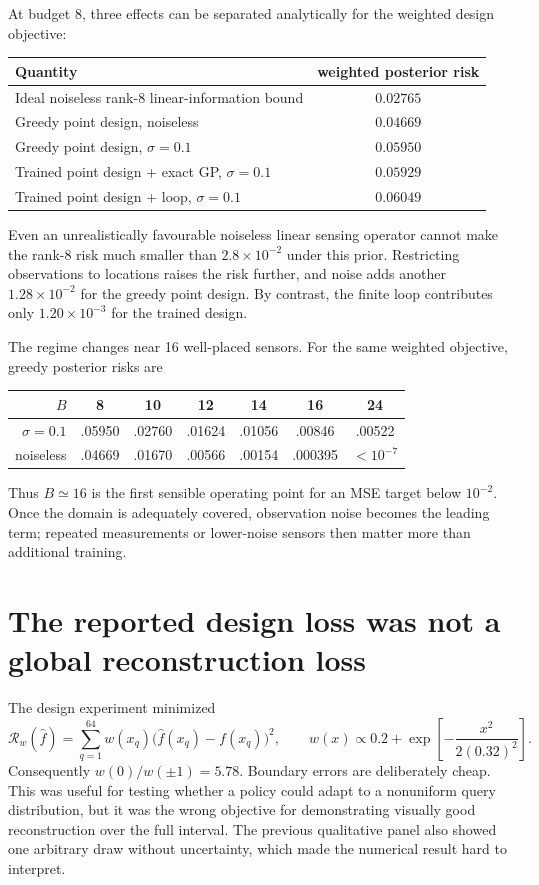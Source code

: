 \documentclass[10pt]{article}
\newcommand{\risk}{\mathcal R}
\begin{document}
At budget 8, three effects can be separated analytically for the weighted
design objective:
\begin{center}
\begin{tabular}{lc}
\toprule
Quantity & weighted posterior risk \\
\midrule
Ideal noiseless rank-8 linear-information bound & $0.02765$ \\
Greedy point design, noiseless & $0.04669$ \\
Greedy point design, $\sigma=0.1$ & $0.05950$ \\
Trained point design + exact GP, $\sigma=0.1$ & $0.05929$ \\
Trained point design + loop, $\sigma=0.1$ & $0.06049$ \\
\bottomrule
\end{tabular}
\end{center}
Even an unrealistically favourable noiseless linear sensing operator cannot
make the rank-8 risk much smaller than $2.8\times10^{-2}$ under this prior.
Restricting observations to locations raises the risk further, and noise adds
another $1.28\times10^{-2}$ for the greedy point design.  By contrast, the
finite loop contributes only $1.20\times10^{-3}$ for the trained design.

The regime changes near 16 well-placed sensors.  For the same weighted
objective, greedy posterior risks are
\begin{center}
\begin{tabular}{rcccccc}
\toprule
$B$ & 8 & 10 & 12 & 14 & 16 & 24 \\
\midrule
$\sigma=0.1$ & .05950 & .02760 & .01624 & .01056 & .00846 & .00522 \\
noiseless & .04669 & .01670 & .00566 & .00154 & .000395 & $<10^{-7}$ \\
\bottomrule
\end{tabular}
\end{center}
Thus $B\simeq16$ is the first sensible operating point for an MSE target below
$10^{-2}$.  Once the domain is adequately covered, observation noise becomes
the leading term; repeated measurements or lower-noise sensors then matter
more than additional training.

\section{The reported design loss was not a global reconstruction loss}

The design experiment minimized
\[
 \risk_w(\widehat f)
 =\sum_{q=1}^{64}w(x_q)\bigl(\widehat f(x_q)-f(x_q)\bigr)^2,
 \qquad
 w(x)\propto 0.2+\exp\!\left[-\frac{x^2}{2(0.32)^2}\right].
\]
Consequently $w(0)/w(\pm1)=5.78$.  Boundary errors are deliberately cheap.
This was useful for testing whether a policy could adapt to a nonuniform query
distribution, but it was the wrong objective for demonstrating visually good
reconstruction over the full interval.  The previous qualitative panel also
showed one arbitrary draw without uncertainty, which made the numerical result
hard to interpret.
\end{document}
